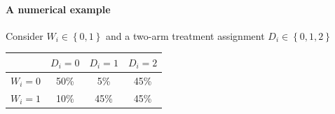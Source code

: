 \documentclass[twoside]{article}
\begin{document}
\paragraph*{A numerical example}
Consider $W_i \in \left\{0,1\right\}$ and a two-arm treatment assignment $D_i\in\left\{ 0,1,2 \right\}$
\begin{table}[ht]
    \begin{center}
      \begin{tabular}{l|ccc}
        & $D_i=0$ & $D_i=1$ & $D_i=2$ \\ \hline
        $W_i=0$ & 50\% & 5\% & 45\% \\
        $W_i=1$ & 10\% & 45\% & 45\%
        \end{tabular}
    \end{center}
\end{table}
\end{document}
